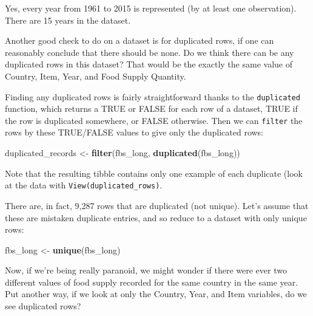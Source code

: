 \documentclass[]{book}
\newenvironment{Shaded}{\begin{snugshade}}{\end{snugshade}}
\newcommand{\KeywordTok}[1]{\textcolor[rgb]{0.13,0.29,0.53}{\textbf{#1}}}
\newcommand{\NormalTok}[1]{#1}
\newcommand{\OperatorTok}[1]{\textcolor[rgb]{0.81,0.36,0.00}{\textbf{#1}}}
\newcommand{\StringTok}[1]{\textcolor[rgb]{0.31,0.60,0.02}{#1}}
\begin{document}
Yes, every year from 1961 to 2015 is represented (by at least one observation). There are 15 years in the dataset.

Another good check to do on a dataset is for duplicated rows, if one can reasonably conclude that there should be none. Do we think there can be any duplicated rows in this dataset? That would be the exactly the same value of Country, Item, Year, and Food Supply Quantity.

Finding any duplicated rows is fairly straightforward thanks to the \texttt{duplicated} function, which returns a TRUE or FALSE for each row of a dataset, TRUE if the row is duplicated somewhere, or FALSE otherwise. Then we can \texttt{filter} the rows by these TRUE/FALSE values to give only the duplicated rows:

\begin{Shaded}
\begin{Highlighting}[]
\NormalTok{duplicated_records <-}\StringTok{ }\KeywordTok{filter}\NormalTok{(fbs_long, }\KeywordTok{duplicated}\NormalTok{(fbs_long))}
\end{Highlighting}
\end{Shaded}

Note that the resulting tibble contains only one example of each duplicate (look at the data with \texttt{View(duplicated\_rows)}.

There are, in fact, 9,287 rows that are duplicated (not unique). Let's assume that these are mistaken duplicate entries, and so reduce to a dataset with only unique rows:

\begin{Shaded}
\begin{Highlighting}[]
\NormalTok{fbs_long <-}\StringTok{ }\KeywordTok{unique}\NormalTok{(fbs_long)}
\end{Highlighting}
\end{Shaded}

Now, if we're being really paranoid, we might wonder if there were ever two different values of food supply recorded for the same country in the same year. Put another way, if we look at only the Country, Year, and Item variables, do we see duplicated rows?

\begin{Shaded}
\end{Shaded}
\end{document}
